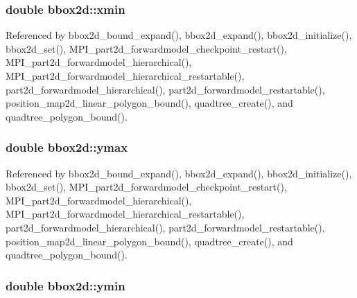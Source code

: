 \subsubsection[{\texorpdfstring{xmin}{xmin}}]{\setlength{\rightskip}{0pt plus 5cm}double bbox2d\+::xmin}\hypertarget{structbbox2d_ab1e3c3b237d5a3b1290607bb0fa67b86}{}\label{structbbox2d_ab1e3c3b237d5a3b1290607bb0fa67b86}


Referenced by bbox2d\+\_\+bound\+\_\+expand(), bbox2d\+\_\+expand(), bbox2d\+\_\+initialize(), bbox2d\+\_\+set(), M\+P\+I\+\_\+part2d\+\_\+forwardmodel\+\_\+checkpoint\+\_\+restart(), M\+P\+I\+\_\+part2d\+\_\+forwardmodel\+\_\+hierarchical(), M\+P\+I\+\_\+part2d\+\_\+forwardmodel\+\_\+hierarchical\+\_\+restartable(), part2d\+\_\+forwardmodel\+\_\+hierarchical(), part2d\+\_\+forwardmodel\+\_\+restartable(), position\+\_\+map2d\+\_\+linear\+\_\+polygon\+\_\+bound(), quadtree\+\_\+create(), and quadtree\+\_\+polygon\+\_\+bound().

\subsubsection[{\texorpdfstring{ymax}{ymax}}]{\setlength{\rightskip}{0pt plus 5cm}double bbox2d\+::ymax}\hypertarget{structbbox2d_a40b610959dbfc797e21296a0dffeaaff}{}\label{structbbox2d_a40b610959dbfc797e21296a0dffeaaff}


Referenced by bbox2d\+\_\+bound\+\_\+expand(), bbox2d\+\_\+expand(), bbox2d\+\_\+initialize(), bbox2d\+\_\+set(), M\+P\+I\+\_\+part2d\+\_\+forwardmodel\+\_\+checkpoint\+\_\+restart(), M\+P\+I\+\_\+part2d\+\_\+forwardmodel\+\_\+hierarchical(), M\+P\+I\+\_\+part2d\+\_\+forwardmodel\+\_\+hierarchical\+\_\+restartable(), part2d\+\_\+forwardmodel\+\_\+hierarchical(), part2d\+\_\+forwardmodel\+\_\+restartable(), position\+\_\+map2d\+\_\+linear\+\_\+polygon\+\_\+bound(), quadtree\+\_\+create(), and quadtree\+\_\+polygon\+\_\+bound().

\subsubsection[{\texorpdfstring{ymin}{ymin}}]{\setlength{\rightskip}{0pt plus 5cm}double bbox2d\+::ymin}\hypertarget{structbbox2d_aad7439c67803e5ecc96a70ed0cfd1a28}{}\label{structbbox2d_aad7439c67803e5ecc96a70ed0cfd1a28}


